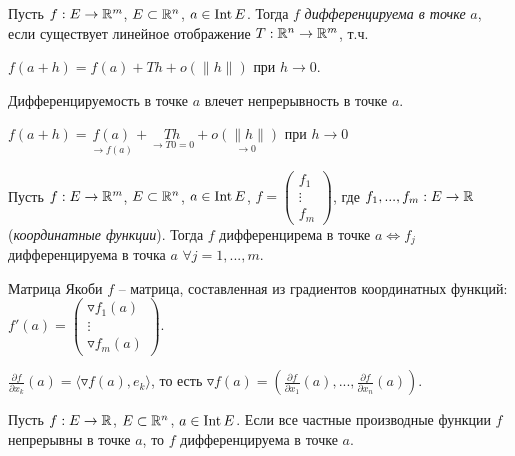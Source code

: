 \documentclass[10pt, oneside, dvipsnames]{extarticle}
\begin{document}
\newpage

\begin{definition}
    Пусть $f: E\rightarrow \mathbb{R}^m$, $E\subset \mathbb{R}^n$, $a\in \operatorname{Int} E$. Тогда $f$ \textit{дифференцируема в точке} $a$, если существует линейное отображение $T: \mathbb{R}^n \rightarrow \mathbb{R}^m$, т.ч. 
    
    $f(a + h) = f(a) + Th + o(\|h\|)$ при $h\rightarrow 0$.
\end{definition}

\begin{remark}
    Дифференцируемость в точке $a$ влечет непрерывность в точке $a$.

    $f(a+h)=\underset{\rightarrow f(a)}{f(a)}+\underset{\rightarrow T0=0}{Th}+\underset{\rightarrow 0}{o(\|h\|)}$ при $h \rightarrow 0$
\end{remark}

\begin{theorem}
    Пусть $f: E\rightarrow \mathbb{R}^m$, $E\subset \mathbb{R}^n$, $a\in \operatorname{Int} E$, $f=\begin{pmatrix}
        f_1  \\ \vdots \\ f_m
    \end{pmatrix}$, где $f_1, ..., f_m: E\rightarrow \mathbb{R}$ (\textit{координатные функции}). Тогда $f$ дифференцирема в точке $a\Leftrightarrow f_j$  дифференцируема в точка $a$ $\forall j=1, ..., m$.
\end{theorem}


\begin{corollary}
    Матрица Якоби $f$ – матрица, составленная из градиентов координатных функций: $f'(a)=\begin{pmatrix}
             \triangledown f_1(a) \\ \vdots \\ \triangledown f_m(a)
         \end{pmatrix}$.
\end{corollary}

\begin{statement}
    $\frac{\partial f}{\partial x_k}(a)=\langle \triangledown f(a), e_k\rangle$, то есть $\triangledown f(a)= (\frac{\partial f}{\partial x_1}(a), ..., \frac{\partial  f}{\partial x_n}(a))$.
\end{statement}

\begin{theorem}
    Пусть $f: E\rightarrow \mathbb{R}$, $E\subset \mathbb{R}^n$, $a\in \operatorname{Int} E$. Если все частные производные функции $f$ непрерывны в точке $a$, то $f$  дифференцируема в точке $a$.
\end{theorem}
\end{document}
